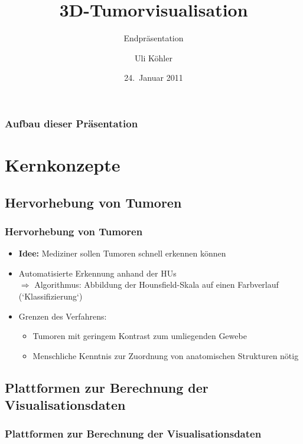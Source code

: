 \documentclass[14pt]{beamer}
\title{3D-Tumorvisualisation}
\subtitle{Endpräsentation}
\author{Uli Köhler}
\institute[EMG]{Ernst-Mach-Gymnasium Haar}
\date{24.~Januar 2011}
\begin{document}
\frame{\titlepage}
\begin{frame}
\frametitle{Aufbau dieser Präsentation}
\tableofcontents
\end{frame}
\section{Kernkonzepte}
\subsection{Hervorhebung von Tumoren}
\begin{frame}[allowframebreaks]
 \frametitle{Hervorhebung von Tumoren}
    \begin{itemize}
     \item \textbf{Idee:} Mediziner sollen Tumoren schnell erkennen können
     \item Automatisierte Erkennung anhand der HUs\\
	  $\Rightarrow$ Algorithmus: Abbildung der Hounsfield-Skala auf einen Farbverlauf (`Klassifizierung`)
     \item Grenzen des Verfahrens:
      \begin{itemize}
	\item Tumoren mit geringem Kontrast zum umliegenden Gewebe
	\item Menschliche Kenntnis zur Zuordnung von anatomischen Strukturen nötig
      \end{itemize}
    \end{itemize}
    \begin{center}
    \end{center}
\end{frame}
\subsection{Plattformen zur Berechnung der Visualisationsdaten}
\begin{frame}
 \frametitle{Plattformen zur Berechnung der Visualisationsdaten}
\vspace{8mm}	
 \begin{center}
 \end{center}
\end{frame}

%
%
%
\end{document}
